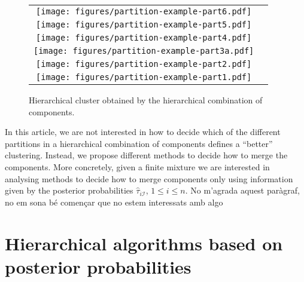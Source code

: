 \documentclass[10pt, a4paper]{article}
\begin{document}
\begin{figure}[thbp]
\begin{center}
\begin{tabular}{cc}
  \texttt{[image: figures/partition-example-part6.pdf]} \\
    \texttt{[image: figures/partition-example-part5.pdf]} \\
      \texttt{[image: figures/partition-example-part4.pdf]} \\
        \texttt{[image: figures/partition-example-part3a.pdf]} \\
          \texttt{[image: figures/partition-example-part2.pdf]} \\
            \texttt{[image: figures/partition-example-part1.pdf]}
 \end{tabular}
 \caption{Hierarchical cluster obtained by the hierarchical combination of components.}\label{hierarchical}
\end{center}
\end{figure}

In this article, we are not interested in how to decide which of the different partitions in a hierarchical combination of components defines a ``better'' clustering. Instead, we propose different methods to decide how to merge the components. More concretely, given a finite mixture we are interested in analysing methods to decide how to merge components only using information given by the posterior probabilities $\hat{\tau}_{i \mathcal{I}}$, $1\leq i \leq n$. {\color{red}No m'agrada aquest paràgraf, no em sona bé començar que no estem interessats amb algo}


\section{Hierarchical algorithms based on posterior probabilities}
\label{old_methods}

\end{document}
